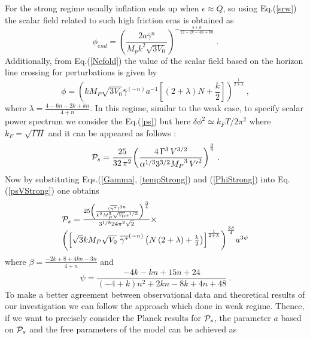 \documentclass[12pt]{revtex4}
\begin{document}
For the strong regime usually inflation ends up when $\epsilon\approx Q$, {so }using Eq.(\ref{srw}) the scalar field related to such high friction eras is obtained as
\begin{equation}
{\phi _{end}} = {(\frac{{2a{{\bar \gamma }^n}}}{{ {M_p}{k^2}\sqrt {{3V_0}} }})^{ - \frac{{4 + n}}{{12 - 2k - 4n + kn}}}}~.\label{phiend}
\end{equation}
Additionally, from  Eq.(\ref{Nefold}) the value of the scalar field based on the horizon line crossing for perturbations is given by
\begin{equation}\label{PhiStrong}
\phi  = {(k{M_P}\sqrt {3{V_0}} {{\bar \gamma }^{( - n)}}{a^{ - 1}}[(2 + \lambda )N + \frac{k}{2}])^{\frac{1}{{2 + \lambda }}}}~,
\end{equation}
where $\lambda=\frac{{4 - 6n - 2k + kn}}{{4 + n}}.$ In this regime, similar to the  weak case,  to specify scalar power spectrum  we consider the Eq.(\ref{ps}) but here $\delta\phi^2\simeq k_F T/2\pi^2$  where $k_F=\sqrt{\Gamma H}$ and it can be appeared as follows {\cite{Herrera:2015aja,sayar}}:
\begin{equation}
{{\cal P}_s}=\frac{{25}}{{32\,{\pi ^2}}}{\left( {\frac{{4\,{\Gamma ^3}\,{V^{3/2}}}}{{{\alpha ^{1/3}}{3^{3/2}}{M_P}^3\,{{V'}^2}}}} \right)^{\frac{3}{4}}}~.\label{psVStrong}
\end{equation}
Now by substituting Eqs.(\ref{Gamma}, \ref{tempStrong}) and (\ref{PhiStrong}) into Eq.(\ref{psVStrong}) one obtains
\begin{equation}
\begin{array}{l}
{{\cal P}_s} =
\frac{{25{{\left( {\frac{{({{\overline {{\gamma ^*}}  }})^{3n}}}{{{k^2}M_P^3\sqrt {{V_0}} {\alpha ^{1/3}}}}} \right)}^{\frac{3}{4}}}}}{{{3^{1/8}}24{\pi ^2}\sqrt 2 }} \times \\
{\left( {{{\left[ {\sqrt 3 k{M_P}\sqrt {{V_0}}~ {{\overline {{\gamma ^*}}  }}^{( - n)}\left( {N\left( {2 + \lambda } \right) + \frac{k}{2}} \right)} \right]}^{\frac{1}{{2 + \lambda }}}}} \right)^{\frac{{3\beta }}{4}}}{a^{{3\psi}} }
 \end{array}\label{psNStrong}
\end{equation}
where $\beta  = \frac{{ - 2k + 8 + 4kn - 3n}}{{4 + n}}$ and $$\psi=\frac{{ -4k - kn  + 15n + 24}}{{( - 4 + k){n^2} + 2kn - 8k + 4n + 48}}~.$$
 To make a better agreement between observational data and theoretical results of our investigation we can follow the approach which { done} in weak regime. Thence, if we want to precisely consider the Planck {results} for ${{\cal P}_s}$, the parameter $a$ based on ${{\cal P}_s}$ and the free parameters of the model can be achieved as
\end{document}
